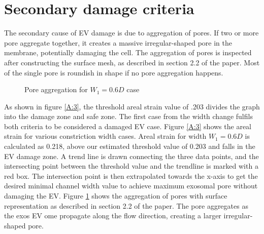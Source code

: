 \section{Secondary damage criteria}

The secondary cause of EV damage is due to aggregation of pores. If two or more pore aggregate together, it creates a massive irregular-shaped pore in the membrane, potentially damaging the cell. The aggregation of pores is inspected after constructing the surface mesh, as described in section 2.2 of the paper. Most of the single pore is roundish in shape if no pore aggregation happens. 

\begin{figure}[htbp]
  \centering
  
  \caption{Pore aggregation for $W_1=0.6D$ case}
  \label{A:4}
\end{figure}

As shown in figure \ref{A:3}, the threshold areal strain value of .203 divides the graph into the damage zone and safe zone. The first case from the width change fulfils both criteria to be considered a damaged EV case. Figure \ref{A:3} shows the areal strain for various constriction width cases. Areal strain for width $W_1=0.6D$ is calculated as 0.218, above our estimated threshold value of 0.203 and falls in the EV damage zone. A trend line is drawn connecting the three data points, and the intersecting point between the threshold value and the trendline is marked with a red box. The intersection point is then extrapolated towards the x-axis to get the desired minimal channel width value to achieve maximum exosomal pore without damaging the EV. Figure \ref{A:4} shows the aggregation of pores with surface representation as described in section 2.2 of the paper. The pore aggregates as the exos EV ome propagate along the flow direction, creating a larger irregular-shaped pore.

